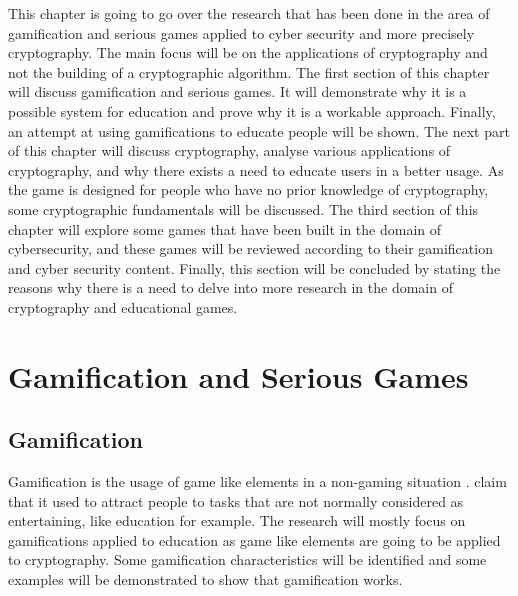 \documentclass{l4proj}
\begin{document}
This chapter is going to go over the research that has been done in the area of gamification and serious games applied to cyber security and more precisely cryptography.
The main focus will be on the applications of cryptography and not the building of a cryptographic algorithm.
The first section of this chapter will discuss gamification and serious games. It will demonstrate why it is a possible system for education and prove why it is a workable approach.
Finally, an attempt at using gamifications to educate people will be shown.
The next part of this chapter will discuss cryptography, analyse various applications of cryptography, and why there exists a need to educate users in a better usage.
As the game is designed for people who have no prior knowledge of cryptography, some cryptographic fundamentals will be discussed.
The third section of this chapter will explore some games that have been built in the domain of cybersecurity, and these games will be reviewed according to 
their gamification and cyber security content.
Finally, this section will be concluded by stating the reasons why there is a need to delve into more research in the domain of cryptography and educational games.

\section{Gamification and Serious Games}

\subsection{Gamification}
Gamification is the usage of game like elements in a non-gaming situation \citep{aparicio_analysis_2012}.
\citet{aparicio_analysis_2012} claim that it used to attract people to tasks that are not normally considered as entertaining, like education for example.
The research will mostly focus on gamifications applied to education as game like elements are going to be applied to cryptography.
Some gamification characteristics will be identified and some examples will be demonstrated to show that gamification works.
\end{document}
